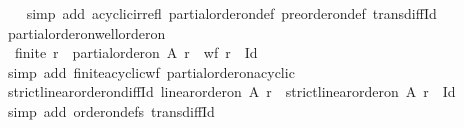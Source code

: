 \begin{isabellebody}
%
\isadelimproof
\ \ %
\endisadelimproof
%
\isatagproof
{}\isamarkupfalse%
\ {\isacharparenleft}{\kern0pt}simp\ add{\isacharcolon}{\kern0pt}\ acyclic{\isacharunderscore}{\kern0pt}irrefl\ partial{\isacharunderscore}{\kern0pt}order{\isacharunderscore}{\kern0pt}on{\isacharunderscore}{\kern0pt}def\ preorder{\isacharunderscore}{\kern0pt}on{\isacharunderscore}{\kern0pt}def\ trans{\isacharunderscore}{\kern0pt}diff{\isacharunderscore}{\kern0pt}Id{\isacharparenright}{\kern0pt}%
\endisatagproof
{\isafoldproof}%
%
\isadelimproof
\isanewline
%
\endisadelimproof
\isanewline
{}\isamarkupfalse%
\ partial{\isacharunderscore}{\kern0pt}order{\isacharunderscore}{\kern0pt}on{\isacharunderscore}{\kern0pt}well{\isacharunderscore}{\kern0pt}order{\isacharunderscore}{\kern0pt}on{\isacharcolon}{\kern0pt}\ \ \ \ \ \ \ \ \ \ \ \ \ \ \ \isanewline
\ \ {\isachardoublequoteopen}finite\ r\ {\isasymLongrightarrow}\ partial{\isacharunderscore}{\kern0pt}order{\isacharunderscore}{\kern0pt}on\ A\ r\ {\isasymLongrightarrow}\ wf\ {\isacharparenleft}{\kern0pt}r\ {\isacharminus}{\kern0pt}\ Id{\isacharparenright}{\kern0pt}{\isachardoublequoteclose}\ \isanewline
%
\isadelimproof
\ \ %
\endisadelimproof
%
\isatagproof
{}\isamarkupfalse%
\ {\isacharparenleft}{\kern0pt}simp\ add{\isacharcolon}{\kern0pt}\ finite{\isacharunderscore}{\kern0pt}acyclic{\isacharunderscore}{\kern0pt}wf\ partial{\isacharunderscore}{\kern0pt}order{\isacharunderscore}{\kern0pt}on{\isacharunderscore}{\kern0pt}acyclic{\isacharparenright}{\kern0pt}%
\endisatagproof
{\isafoldproof}%
%
\isadelimproof
\ \isanewline
%
\endisadelimproof
\isanewline
{}\isamarkupfalse%
\ strict{\isacharunderscore}{\kern0pt}linear{\isacharunderscore}{\kern0pt}order{\isacharunderscore}{\kern0pt}on{\isacharunderscore}{\kern0pt}diff{\isacharunderscore}{\kern0pt}Id{\isacharcolon}{\kern0pt}\ {\isachardoublequoteopen}linear{\isacharunderscore}{\kern0pt}order{\isacharunderscore}{\kern0pt}on\ A\ r\ {\isasymLongrightarrow}\ strict{\isacharunderscore}{\kern0pt}linear{\isacharunderscore}{\kern0pt}order{\isacharunderscore}{\kern0pt}on\ A\ {\isacharparenleft}{\kern0pt}r\ {\isacharminus}{\kern0pt}\ Id{\isacharparenright}{\kern0pt}{\isachardoublequoteclose}\isanewline
%
\isadelimproof
\ \ %
\endisadelimproof
%
\isatagproof
{}\isamarkupfalse%
\ {\isacharparenleft}{\kern0pt}simp\ add{\isacharcolon}{\kern0pt}\ order{\isacharunderscore}{\kern0pt}on{\isacharunderscore}{\kern0pt}defs\ trans{\isacharunderscore}{\kern0pt}diff{\isacharunderscore}{\kern0pt}Id{\isacharparenright}{\kern0pt}%
\endisatagproof
{\isafoldproof}%

\end{isabellebody}
